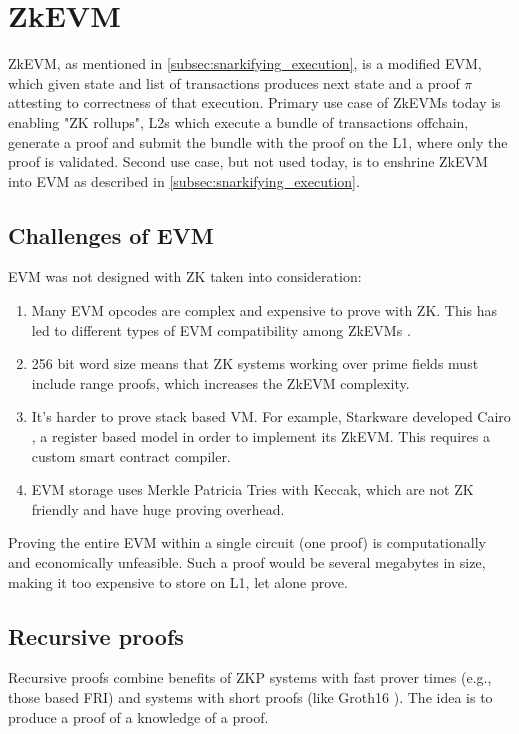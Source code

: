 \section{ZkEVM}

ZkEVM, as mentioned in \ref{subsec:snarkifying_execution}, is a modified EVM,
which given state and list of transactions produces next state and a proof $\pi$
attesting to correctness of that execution. Primary use case of ZkEVMs today is
enabling "ZK rollups", L2s which execute a bundle of transactions offchain,
generate a proof and submit the bundle with the proof on the L1, where only the
proof is validated. Second use case, but not used today, is to enshrine ZkEVM
into EVM as described in \ref{subsec:snarkifying_execution}.

\subsection{Challenges of EVM}

EVM was not designed with ZK taken into consideration:

\begin{enumerate}
	\item Many EVM opcodes are complex and expensive to prove with ZK. This has
		led to different types of EVM compatibility among ZkEVMs \cite{VitalikButerinZkEVMTypes}.
	\item 256 bit word size means that ZK systems working over prime fields must
		include range proofs, which increases the ZkEVM complexity.
	\item It's harder to prove stack based VM. For example, Starkware developed
		Cairo \cite{Cairo}, a register based model in order to implement its ZkEVM.
		This requires a custom smart contract compiler.
	\item EVM storage uses Merkle Patricia Tries with Keccak, which are not
		ZK friendly and have huge proving overhead.
\end{enumerate}

Proving the entire EVM within a single circuit (one proof) is computationally
and economically unfeasible. Such a proof would be several megabytes in size,
making it too expensive to store on L1, let alone prove.

\subsection{Recursive proofs}

Recursive proofs combine benefits of ZKP systems with fast prover times (e.g.,
those based FRI) and systems with short proofs (like Groth16 \cite{Groth16}). The idea is to
produce a proof of a knowledge of a proof.

